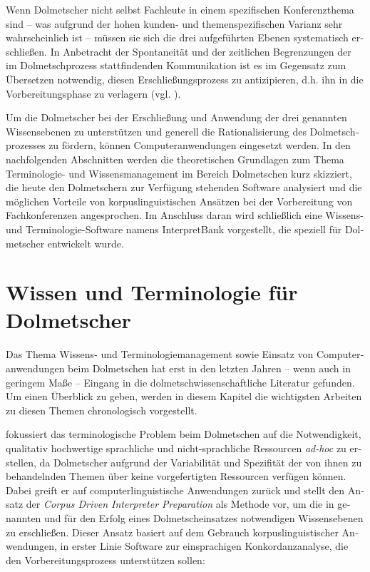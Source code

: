 \documentclass[output=paper]{LSP/langsci}
\begin{document}
\begin{otherlanguage}{ngerman}
Wenn Dolmetscher nicht selbst Fachleute in einem spezifischen Konferenzthema sind -- was aufgrund der hohen kunden- und themenspezifischen Varianz sehr wahrscheinlich ist -- müssen sie sich die drei aufgeführten Ebenen systematisch erschließen. In Anbetracht der Spontaneität und der zeitlichen Begrenzungen der im Dolmetschprozess stattfindenden Kommunikation ist es im Gegensatz zum Übersetzen notwendig, diesen Erschließungsprozess zu antizipieren, d.h. ihn in die Vorbereitungsphase zu verlagern (vgl. \citealt{Gile1995,Stoll2009,Will2009}).

Um die Dolmetscher bei der Erschließung und Anwendung der drei genannten Wissensebenen zu unterstützen und generell die Rationalisierung des Dolmetschprozesses zu fördern, können Computeranwendungen eingesetzt werden. In den nachfolgenden Abschnitten werden die theoretischen Grundlagen zum Thema Terminologie- und Wissensmanagement im Bereich Dolmetschen kurz skizziert, die heute den Dolmetschern zur Verfügung stehenden Software analysiert und die möglichen Vorteile von korpuslinguistischen Ansätzen bei der Vorbereitung von Fachkonferenzen angesprochen. Im Anschluss daran wird schließlich eine Wissens- und Terminologie-Software namens InterpretBank vorgestellt, die speziell für Dolmetscher entwickelt wurde.

\section{Wissen und Terminologie für Dolmetscher}\label{sec:fantinuoli:2}

Das Thema Wissens- und Terminologiemanagement sowie Einsatz von Computeranwendungen beim Dolmetschen hat erst in den letzten Jahren -- wenn auch in geringem Maße -- Eingang in die dolmetschwissenschaftliche Literatur gefunden. Um einen Überblick zu geben, werden in diesem Kapitel die wichtigsten Arbeiten zu diesen Themen chronologisch vorgestellt.

\citet{Fantinuoli2006} fokussiert das terminologische Problem beim Dolmetschen auf die Notwendigkeit, qualitativ hochwertige sprachliche und nicht-sprachliche Ressourcen \textit{ad-hoc} zu erstellen, da Dolmetscher aufgrund der Variabilität und Spezifität der von ihnen zu behandelnden Themen über keine vorgefertigten Ressourcen verfügen können. Dabei greift er auf computerlinguistische Anwendungen zurück und stellt den Ansatz der \textit{Corpus Driven Interpreter Preparation} als Methode vor, um die in  genannten und für den Erfolg eines Dolmetscheinsatzes notwendigen Wissensebenen zu erschließen. Dieser Ansatz basiert auf dem Gebrauch korpuslinguistischer Anwendungen, in erster Linie Software zur einsprachigen Konkordanzanalyse, die den Vorbereitungsprozess unterstützen sollen:


\end{otherlanguage}
\end{document}
